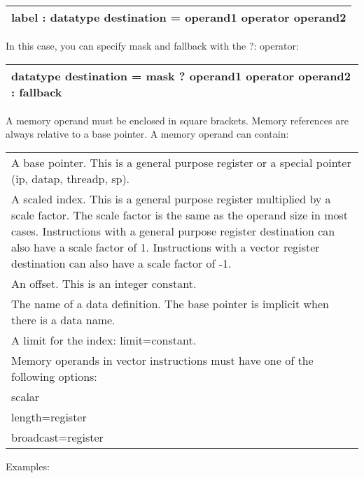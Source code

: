 \documentclass[forwardcom.tex]{subfiles}
\begin{document}
\begin{tabular}{|p{140mm}|}
\hline
\hspace{4mm} label : datatype destination = operand1 operator operand2 \\
\hline
\end{tabular}
\vspace{4mm}

In this case, you can specify mask and fallback with the ?: operator:
\vspace{2mm}

\begin{tabular}{|p{140mm}|}
\hline
\hspace{4mm} datatype destination = mask ? operand1 operator operand2 : fallback\\
\hline
\end{tabular}
\vspace{4mm}

A memory operand must be enclosed in square brackets. Memory references are always relative to a base pointer. A memory operand can contain:
\vspace{2mm}

\begin{tabular}{|p{150mm}|}
\hline
A base pointer. This is a general purpose register or a special pointer (ip, datap, threadp, sp).\\
A scaled index. This is a general purpose register multiplied by a scale factor. The scale factor is the same as the operand size in most cases. Instructions with a general purpose register destination can also have a scale factor of 1. Instructions with a vector register destination can also have a scale factor of -1. \\
An offset. This is an integer constant.\\
The name of a data definition. The base pointer is implicit when there is a data name.\\
A limit for the index: limit=constant.\\
Memory operands in vector instructions must have one of the following options:\\
scalar\\
length=register\\
broadcast=register\\
\hline
\end{tabular}

\vspace{4mm}

Examples:
\vspace{2mm}
\end{document}
